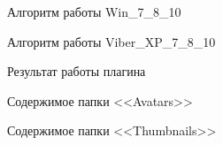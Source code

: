 \begin{figure}[ht]
\caption{ Алгоритм работы Win\_7\_8\_10 }
\label{kucher_6:kucher_6}
\end{figure} 

\begin{figure}[h!]
\caption{ Алгоритм работы Viber\_XP\_7\_8\_10 }
\label{kucher_7:kucher_7}
\end{figure} 

\clearpage

\begin{figure}[h!]
\caption{ Результат работы плагина }
\label{kucher_8:kucher_8}
\end{figure} 

\begin{figure}[h!]
\caption{ Содержимое папки <<Avatars>> }
\label{kucher_9:kucher_9}
\end{figure} 

\begin{figure}[h!]
\caption{ Содержимое папки <<Thumbnails>> }
\label{kucher_10:kucher_10}
\end{figure} 

\clearpage
